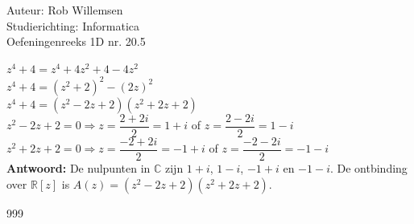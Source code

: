 \documentclass[a4paper]{article}
\begin{document}
\noindent \large Auteur: Rob Willemsen \\
\noindent \large Studierichting: Informatica\\
\noindent \large Oefeningenreeks 1D nr. 20.5\\

\medskip

\normalsize

$z^4 + 4 = z^4 + 4z^2 + 4 - 4z^2$ \\

$z^4 + 4 = (z^2 + 2)^2 - (2z)^2$ \\

$z^4 + 4 = (z^2 - 2z + 2)(z^2 + 2z + 2)$ \\

$z^2 - 2z + 2 = 0 \Rightarrow z = \dfrac{2 + 2i}{2} = 1 + i$ of $z = \dfrac{2 - 2i}{2} = 1 - i$ \\

$z^2 + 2z + 2 = 0 \Rightarrow z = \dfrac{-2 + 2i}{2} = -1 + i$ of $z = \dfrac{-2 - 2i}{2} = -1 - i$ \\

\textbf{Antwoord:} De nulpunten in $\mathbb{C}$ zijn $1+i$, $1-i$, $-1+i$ en $-1-i$. De ontbinding over $\mathbb{R}[z]$ is $A(z) = (z^2 - 2z + 2)(z^2 + 2z + 2)$. \\

\begin{thebibliography}{999}
\end{thebibliography}
\end{document}
